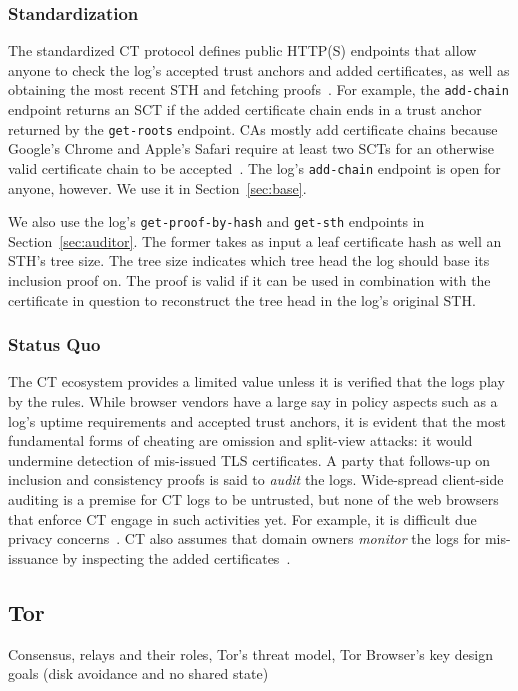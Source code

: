 \subsubsection{Standardization}
The standardized CT protocol defines public HTTP(S) endpoints that allow anyone
to check the log's accepted trust anchors and added certificates, as well as
obtaining the most recent STH and fetching proofs~\cite{ct,ct/bis}.  For
example, the \texttt{add-chain} endpoint returns an SCT if the added
certificate chain ends in a trust anchor returned by the \texttt{get-roots}
endpoint.  CAs mostly add certificate chains because Google's Chrome and
Apple's Safari require at least two SCTs for an otherwise valid certificate
chain to be accepted~\cite{chrome-policy,safari-policy}.  The log's
\texttt{add-chain} endpoint is open for anyone, however.  We use it in
Section~\ref{sec:base}.

We also use the log's \texttt{get-proof-by-hash} and \texttt{get-sth} endpoints
in Section~\ref{sec:auditor}.  The former takes as input a leaf certificate hash
as well an STH's tree size.  The tree size indicates which tree head the log
should base its inclusion proof on.  The proof is valid if it can be used in
combination with the certificate in question to reconstruct the tree head in the
log's original STH.

\subsubsection{Status Quo}
The CT ecosystem provides a limited value unless it is verified that the logs
play by the rules.  While browser vendors have a large say in policy aspects
such as a log's uptime requirements and accepted trust anchors, it is evident
that the most fundamental forms of cheating are omission and split-view
attacks:
	it would undermine detection of mis-issued TLS certificates.
A party that follows-up on inclusion and consistency proofs is said to
\emph{audit} the logs.  Wide-spread client-side auditing is a premise for CT
logs to be untrusted, but none of the web browsers that enforce CT
engage in such activities yet.  For example, it is difficult due privacy
concerns~\cite{ct-with-privacy}.  CT also assumes that domain owners
\emph{monitor} the logs for mis-issuance by inspecting the added
certificates~\cite{lwm,ct-monitors}.

\subsection{Tor} \label{sec:background:tor}
Consensus, relays and their roles, Tor's threat model, Tor Browser's key
design goals (disk avoidance and no shared state)
